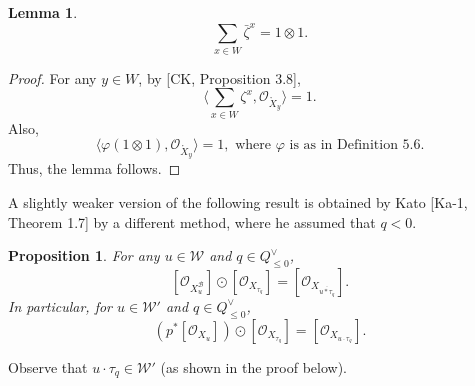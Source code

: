 \documentclass{article}
\newtheorem{lemma}[theorem]{Lemma}
\newtheorem{proposition}[theorem]{Proposition}
\def\B{\mathcal{B}}
\def\W{\mathcal{W}}
\def\ref#1{#1}
\begin{document}
\begin{lemma} \label{5.18}
$$
\sum_{x\in W} \bar{\zeta}^x =1\otimes 1.
$$
\end{lemma}

\begin{proof}
For any $y\in W$, by [CK, Proposition 3.8], 
$$
\langle \sum_{x\in W} \zeta^{x} ,\mathcal{O}_{\mathring{X}_y}\rangle= 1.
$$
Also, 
$$
\langle \varphi\left(1\otimes 1\right),\mathcal{O}_{\mathring{X}_y}\rangle=1, \mbox{ where $\varphi$ is as in Definition \ref{5.6}.} 
$$
Thus, the lemma follows. 
\end{proof}

A slightly weaker version of the following result is obtained by Kato [Ka-1, Theorem 1.7] by a different method, where he assumed that $q<0$. 

\begin{proposition}\label{5.19}
For any $u\in \W$ and $q\in Q^\vee_{\leq0}$, 
\begin{equation}\label{5.19.1}
\left[\mathcal{O}_{X_u^\B}\right]\odot \left[\mathcal{O}_{X_{\tau_q}}\right] = \left[ \mathcal{O}_{X_{\overline{u*\tau_q}}}\right].
\end{equation}
In particular, for $u\in\W'$ and $q\in Q_{\leq0}^\vee$, 
\begin{equation}\label{5.19.2}
\left(p^*\left[\mathcal{O}_{X_u}\right]\right)\odot \left[\mathcal{O}_{X_{\tau_q}}\right] = \left[ \mathcal{O}_{X_{{u\cdot\tau_q}}}\right].
\end{equation}
\end{proposition}

Observe that $u\cdot\tau_q\in\W'$ (as shown in the proof below).
\end{document}
